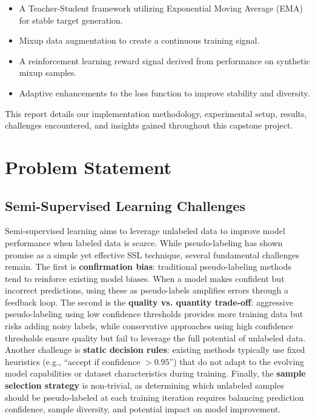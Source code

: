 \documentclass{scrartcl}
\begin{document}
\begin{itemize}
    \item A Teacher-Student framework utilizing Exponential Moving Average (EMA) for stable target generation.
    \item Mixup data augmentation to create a continuous training signal.
    \item A reinforcement learning reward signal derived from performance on synthetic mixup samples.
    \item Adaptive enhancements to the loss function to improve stability and diversity.
\end{itemize}

This report details our implementation methodology, experimental setup, results, challenges encountered, and insights gained throughout this capstone project.

\section{Problem Statement}

\subsection{Semi-Supervised Learning Challenges}

Semi-supervised learning aims to leverage unlabeled data to improve model performance when labeled data is scarce. While pseudo-labeling has shown promise as a simple yet effective SSL technique, several fundamental challenges remain. The first is \textbf{confirmation bias}: traditional pseudo-labeling methods tend to reinforce existing model biases. When a model makes confident but incorrect predictions, using these as pseudo-labels amplifies errors through a feedback loop. The second is the \textbf{quality vs. quantity trade-off}: aggressive pseudo-labeling using low confidence thresholds provides more training data but risks adding noisy labels, while conservative approaches using high confidence thresholds ensure quality but fail to leverage the full potential of unlabeled data. Another challenge is \textbf{static decision rules}: existing methods typically use fixed heuristics (e.g., “accept if confidence $> 0.95$”) that do not adapt to the evolving model capabilities or dataset characteristics during training. Finally, the \textbf{sample selection strategy} is non-trivial, as determining which unlabeled samples should be pseudo-labeled at each training iteration requires balancing prediction confidence, sample diversity, and potential impact on model improvement.
\end{document}
